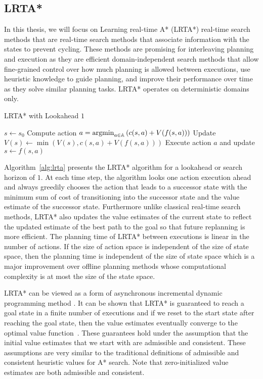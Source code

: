 \subsection{LRTA*}
\label{sec:lrta}

In this thesis, we will focus on Learning real-time A* (LRTA*) real-time search methods
that are real-time search methods that associate information with the
states to prevent cycling. These methods are promising for
interleaving planning and execution as they are efficient
domain-independent search methods that allow fine-grained control over
how much planning is allowed between executions, use heuristic
knowledge to guide planning, and improve their performance over time
as they solve similar planning tasks. LRTA* operates on deterministic
domains only.

\begin{algorithm}[t]
  \caption{LRTA* with Lookahead $1$~\cite{DBLP:journals/ai/Korf90}}
  \begin{algorithmic}[1]
    \State $s \leftarrow s_0$
    \State Compute action $a = \operatorname*{argmin}_{a \in \mathbb{A}} \left( c(s, a) +
      V(f(s, a)) \right)$
    \State Update $V(s) \leftarrow \min\left( V(s), c(s, a) + V(f(s,
      a)) \right)$
    \State Execute action $a$ and update $s \leftarrow f(s, a)$
    \EndWhile
  \end{algorithmic}
  \label{alg:lrta}
\end{algorithm}

Algorithm~\ref{alg:lrta} presents the LRTA* algorithm for a lookahead
or search horizon of $1$. At each time step, the algorithm looks one
action execution ahead and always greedily chooses the action that
leads to a successor state with the minimum sum of cost of
transitioning into the successor state and the value estimate of the
successor state. Furthermore unlike classical real-time search
methods, LRTA* also updates the value estimates of the current state
to reflect the updated estimate of the best path to the goal so that
future replanning is more efficient. The planning time of LRTA*
between executions is linear in the number of actions. If the size of
action space is independent of the size of state space, then the
planning time is independent of the size of state space which is a
major improvement over offline planning methods whose computational
complexity is at most the size of the state space.

LRTA* can be viewed as a form of asynchronous incremental dynamic
programming method \cite{DBLP:journals/ai/BartoBS95}. It can be shown
that LRTA* is guaranteed to reach a goal state in a finite number of
executions and if we reset to the start state after reaching the goal
state, then the value estimates eventually converge to the optimal
value function~\cite{DBLP:journals/ai/Korf90}. These guarantees hold
under the assumption that the initial value estimates that we start
with are admissible and consistent. These assumptions are very similar
to the traditional definitions of admissible and consistent heuristic
values for A* search. Note that zero-initialized value estimates are
both admissible and consistent.

